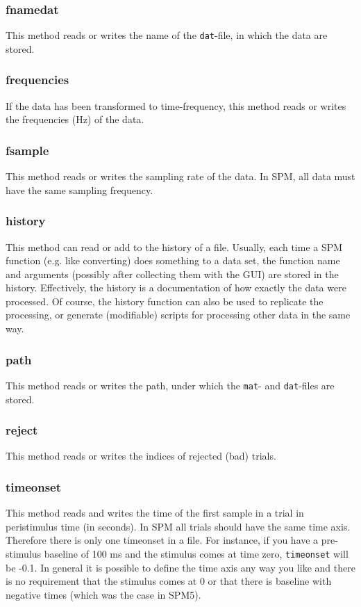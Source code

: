 \subsubsection{fnamedat}
This method reads or writes the name of the \texttt{dat}-file, in which the data are stored.

\subsubsection{frequencies}
If the data has been transformed to time-frequency, this method reads or writes the frequencies (Hz) of the data.

\subsubsection{fsample}
This method reads or writes the sampling rate of the data. In SPM, all data must have the same sampling frequency.

\subsubsection{history}
This method can read or add to the history of a file. Usually, each time a SPM function (e.g. like converting) does something to a data set, the function name and arguments (possibly after collecting them with the GUI) are stored in the history. Effectively, the history is a documentation of how exactly the data were processed. Of course, the history function can also be used to replicate the processing, or generate (modifiable) scripts for processing other data in the same way.

\subsubsection{path}
This method reads or writes the path, under which the \texttt{mat}- and \texttt{dat}-files are stored.

\subsubsection{reject}
This method reads or writes the indices of rejected (bad) trials.

\subsubsection{timeonset}
This method reads and writes the time of the first sample in a trial in peristimulus time (in seconds). In SPM all trials should have the same time axis. Therefore there is only one timeonset in a file. For instance, if you have a pre-stimulus baseline of 100 ms and the stimulus comes at time zero, \texttt{timeonset} will be -0.1. In general it is possible to define the time axis any way you like and there is no requirement that the stimulus comes at 0 or that there is baseline with negative times (which was the case in SPM5).

